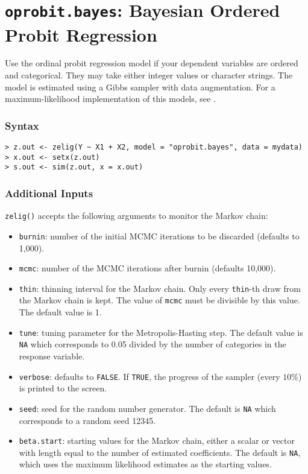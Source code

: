 \section{\texttt{oprobit.bayes}: Bayesian Ordered Probit Regression}

\label{oprobit.bayes}

Use the ordinal probit regression model if your dependent variables are ordered and 
categorical.  They may take either integer values or character strings.  The model 
is estimated using a Gibbs sampler with data augmentation.  For a 
maximum-likelihood implementation of this models, see .

\subsubsection{Syntax}
\begin{verbatim}
> z.out <- zelig(Y ~ X1 + X2, model = "oprobit.bayes", data = mydata)
> x.out <- setx(z.out)
> s.out <- sim(z.out, x = x.out)
\end{verbatim}


\subsubsection{Additional Inputs}

{\tt zelig()} accepts the following arguments to monitor the Markov
chain:  
\begin{itemize}
\item \texttt{burnin}: number of the initial MCMC iterations to be 
 discarded (defaults to 1,000).

\item \texttt{mcmc}: number of the MCMC iterations after burnin
(defaults 10,000).

\item \texttt{thin}: thinning interval for the Markov chain. Only every 
 \texttt{thin}-th draw from the Markov chain is kept. The value of
\texttt{mcmc} must be divisible by this value. The default value is 1.

\item{\texttt{tune}}: tuning parameter for the Metropolis-Hasting step.
The default value is \texttt{NA} which corresponds to 0.05 divided by
the number of categories in the response variable.

\item \texttt{verbose}: defaults to {\tt FALSE}.  If \texttt{TRUE},
the progress of the sampler (every $10\%$) is printed to the screen.

\item \texttt{seed}: seed for the random number generator. The default 
is \texttt{NA} which corresponds to a random seed 12345.

\item \texttt{beta.start}: starting values for the Markov 
chain, either a scalar or vector with length equal to the number 
of estimated coefficients. The default is \texttt{NA}, which uses the
maximum likelihood estimates as the starting values.  

\end{itemize}

